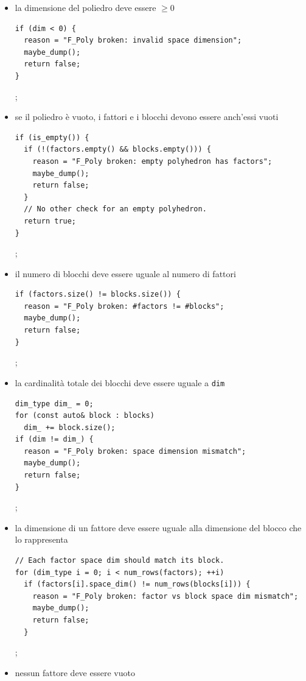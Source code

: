 \documentclass[italian]{mimosis}
\theoremstyle{definition}
\begin{document}
\begin{itemize}
\item la dimensione del poliedro deve essere \(\ge 0\)
\lstset{style=mystyle,language=C++,label= ,caption= ,captionpos=b,numbers=none}
\begin{lstlisting}
if (dim < 0) {
  reason = "F_Poly broken: invalid space dimension";
  maybe_dump();
  return false;
}
\end{lstlisting}
;
\item se il poliedro è vuoto, i fattori e i blocchi devono essere anch'essi vuoti
\lstset{style=mystyle,language=C++,label= ,caption= ,captionpos=b,numbers=none}
\begin{lstlisting}
if (is_empty()) {
  if (!(factors.empty() && blocks.empty())) {
    reason = "F_Poly broken: empty polyhedron has factors";
    maybe_dump();
    return false;
  }
  // No other check for an empty polyhedron.
  return true;
}
\end{lstlisting}
;
\item il numero di blocchi deve essere uguale al numero di fattori
\lstset{style=mystyle,language=C++,label= ,caption= ,captionpos=b,numbers=none}
\begin{lstlisting}
if (factors.size() != blocks.size()) {
  reason = "F_Poly broken: #factors != #blocks";
  maybe_dump();
  return false;
}
\end{lstlisting}
;
\item la cardinalità totale dei blocchi deve essere uguale a \texttt{dim}
\lstset{style=mystyle,language=C++,label= ,caption= ,captionpos=b,numbers=none}
\begin{lstlisting}
dim_type dim_ = 0;
for (const auto& block : blocks)
  dim_ += block.size();
if (dim != dim_) {
  reason = "F_Poly broken: space dimension mismatch";
  maybe_dump();
  return false;
}
\end{lstlisting}
;
\item la dimensione di un fattore deve essere uguale alla dimensione del blocco
che lo rappresenta
\lstset{style=mystyle,language=C++,label= ,caption= ,captionpos=b,numbers=none}
\begin{lstlisting}
// Each factor space dim should match its block.
for (dim_type i = 0; i < num_rows(factors); ++i)
  if (factors[i].space_dim() != num_rows(blocks[i])) {
    reason = "F_Poly broken: factor vs block space dim mismatch";
    maybe_dump();
    return false;
  }
\end{lstlisting}
;
\item nessun fattore deve essere vuoto
\lstset{style=mystyle,language=C++,label= ,caption= ,captionpos=b,numbers=none}

\end{itemize}
\end{document}

